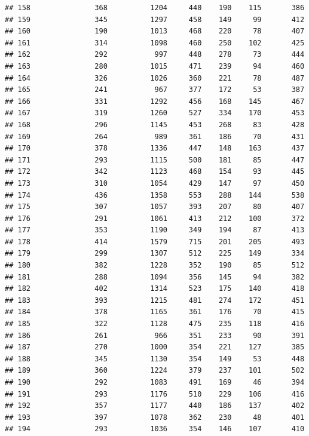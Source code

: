 \documentclass[]{book}
\begin{document}
\begin{verbatim}
## 158               368          1204     440    190    115       386
## 159               345          1297     458    149     99       412
## 160               190          1013     468    220     78       407
## 161               314          1098     460    250    102       425
## 162               292           997     448    278     73       444
## 163               280          1015     471    239     94       460
## 164               326          1026     360    221     78       487
## 165               241           967     377    172     53       387
## 166               331          1292     456    168    145       467
## 167               319          1260     527    334    170       453
## 168               296          1145     453    268     83       428
## 169               264           989     361    186     70       431
## 170               378          1336     447    148    163       437
## 171               293          1115     500    181     85       447
## 172               342          1123     468    154     93       445
## 173               310          1054     429    147     97       450
## 174               436          1358     553    288    144       538
## 175               307          1057     393    207     80       407
## 176               291          1061     413    212    100       372
## 177               353          1190     349    194     87       413
## 178               414          1579     715    201    205       493
## 179               299          1307     512    225    149       334
## 180               382          1228     352    190     85       512
## 181               288          1094     356    145     94       382
## 182               402          1314     523    175    140       418
## 183               393          1215     481    274    172       451
## 184               378          1165     361    176     70       415
## 185               322          1128     475    235    118       416
## 186               261           966     351    233     90       391
## 187               270          1000     354    221    127       385
## 188               345          1130     354    149     53       448
## 189               360          1224     379    237    101       502
## 190               292          1083     491    169     46       394
## 191               293          1176     510    229    106       416
## 192               357          1177     440    186    137       402
## 193               397          1078     362    230     48       401
## 194               293          1036     354    146    107       410

\end{verbatim}
\end{document}
